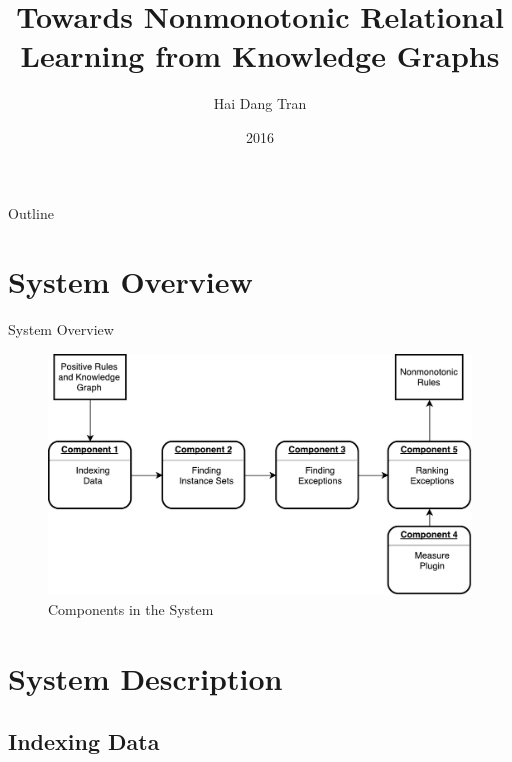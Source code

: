 \documentclass{beamer}
\title{Towards Nonmonotonic Relational Learning from Knowledge Graphs}
\subtitle{}
\author{Hai Dang Tran\inst{1}}
\institute[Max Planck Institute for Informatics] %
{
  \inst{1}%
  Saarland University\\
  Max Planck Institute for Informatics
}
\date{2016}
\begin{document}
\begin{frame}
  \titlepage
\end{frame}

\begin{frame}{Outline}
  \tableofcontents
\end{frame}

\section{System Overview}

\begin{frame}{System Overview}

\begin{figure}[h]
	\centering
	\includegraphics[page=1,width=.75\textwidth]{overview.pdf}
	\caption{Components in the System}
\end{figure}

\end{frame}

\section{System Description}

\subsection{Indexing Data}
\end{document}
